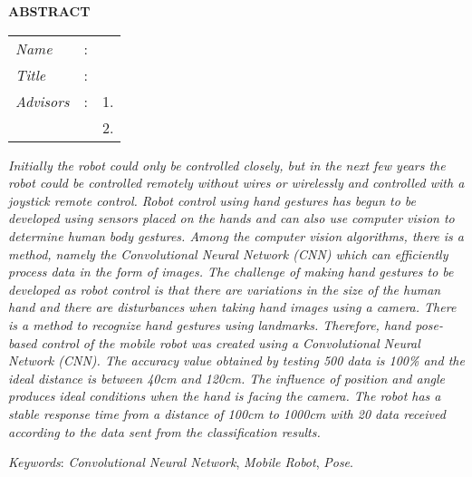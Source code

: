 \begin{center}
  \large\textbf{ABSTRACT}
\end{center}


\vspace{2ex}

\begingroup
\setlength{\tabcolsep}{0pt}

\noindent
\begin{tabularx}{\textwidth}{l >{\centering}m{3em} X}
  \emph{Name}     & : & \name{}         \\

  \emph{Title}    & : & \engtatitle{}   \\

  \emph{Advisors} & : & 1. \advisor{}   \\
                  &   & 2. \coadvisor{} \\
\end{tabularx}
\endgroup

\emph{Initially the robot could only be controlled closely, but in the next few years the robot could be controlled remotely without wires or wirelessly and controlled with a joystick remote control. Robot control using hand gestures has begun to be developed using sensors placed on the hands and can also use computer vision to determine human body gestures. Among the computer vision algorithms, there is a method, namely the Convolutional Neural Network (CNN) which can efficiently process data in the form of images. The challenge of making hand gestures to be developed as robot control is that there are variations in the size of the human hand and there are disturbances when taking hand images using a camera. There is a method to recognize hand gestures using landmarks. Therefore, hand pose-based control of the mobile robot was created using a Convolutional Neural Network (CNN). The accuracy value obtained by testing 500 data is 100\% and the ideal distance is between 40cm and 120cm. The influence of position and angle produces ideal conditions when the hand is facing the camera. The robot has a stable response time from a distance of 100cm to 1000cm with 20 data received according to the data sent from the classification results.}

\vspace{2ex}
\noindent
\emph{Keywords}: \emph{Convolutional Neural Network}, \emph{Mobile Robot}, \emph{Pose}.
